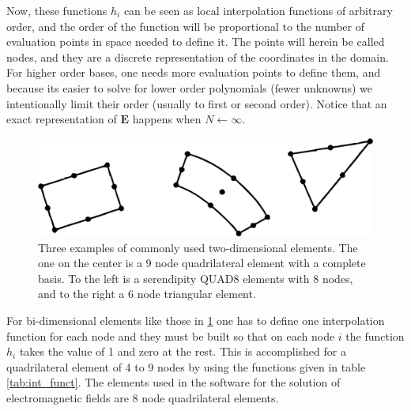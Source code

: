 Now, these functions $h_i$ can be seen as local interpolation functions of arbitrary order, and the order of the function will be proportional to the number of evaluation points in space needed to define it. The points will herein be called nodes, and they are a discrete representation of the coordinates in the domain. For higher order bases, one needs more evaluation points to define them, and because its easier to solve for lower order polynomials (fewer unknowns) we intentionally limit their order (usually to first or second order). Notice that an exact representation of $\mathbf{E}$ happens when $N\leftarrow\infty$.

\begin{figure}
\centering
\includegraphics[scale=0.5]{./img/two_dim_elem.pdf}
\caption{Three examples of commonly used two-dimensional elements. The one on the center is a 9 node quadrilateral element with a complete basis. To the left is a serendipity QUAD8 elements with 8 nodes, and to the right a 6 node triangular element.\cite{Bathe1996}}
\label{fig:2d_elem}
\end{figure}

For bi-dimensional elements like those in \ref{fig:2d_elem} one has to define one interpolation function for each node and they must be built so that on each node $i$ the function $h_i$ takes the value of 1 and zero at the rest. This is accomplished for a quadrilateral element of 4 to 9 nodes by using the functions given in table \ref{tab:int_funct}. The elements used in the software for the solution of electromagnetic fields are 8 node quadrilateral elements.

